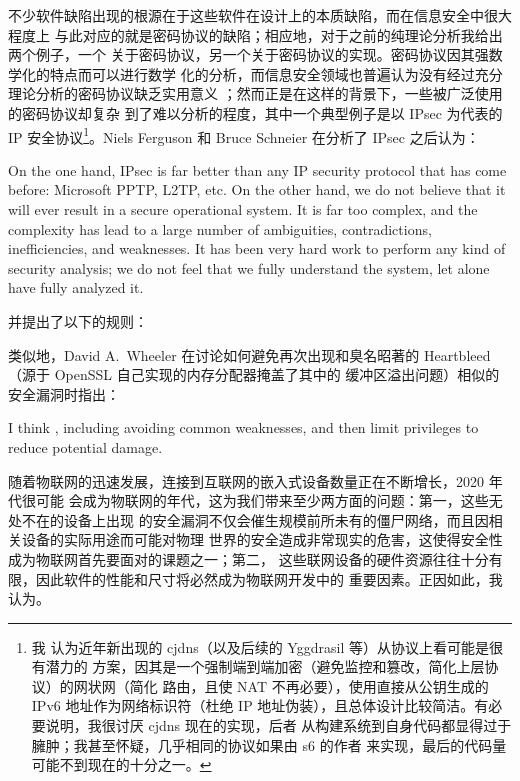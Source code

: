 不少软件缺陷出现的根源在于这些软件在设计上的本质缺陷，而在信息安全中很大程度上
与此对应的就是密码协议的缺陷；相应地，对于之前的纯理论分析我给出两个例子，一个
关于密码协议，另一个关于密码协议的实现。密码协议因其强数学化的特点而可以进行数学
化的分析，而信息安全领域也普遍认为没有经过充分理论分析的密码协议缺乏实用意义%
；然而正是在这样的背景下，一些被广泛使用的密码协议却复杂
到了难以分析的程度，其中一个典型例子是以 IPsec 为代表的 IP 安全协议\footnote{我
认为近年新出现的 cjdns（以及后续的 Yggdrasil 等）从协议上看可能是很有潜力的
方案，因其是一个强制端到端加密（避免监控和篡改，简化上层协议）的网状网（简化
路由，且使 NAT 不再必要），使用直接从公钥生成的 IPv6 地址作为网络标识符（杜绝
IP 地址伪装），且总体设计比较简洁。有必要说明，我很讨厌 cjdns 现在的实现，后者
从构建系统到自身代码都显得过于臃肿；我甚至怀疑，几乎相同的协议如果由 s6 的作者
来实现，最后的代码量可能不到现在的十分之一。}。Niels Ferguson 和 Bruce Schneier
在分析了 IPsec 之后认为：
\begin{quoting}
	On the one hand, IPsec is far better than any IP security protocol that has
	come before: Microsoft PPTP, L2TP, etc.  On the other hand, we do not
	believe that it will ever result in a secure operational system.  It is far
	too complex, and the complexity has lead to a large number of ambiguities,
	contradictions, inefficiencies, and weaknesses.  It has been very hard work
	to perform any kind of security analysis; we do not feel that we fully
	understand the system, let alone have fully analyzed it.
\end{quoting}
并提出了以下的规则：
\begin{quoting}
\end{quoting}
类似地，David A.\ Wheeler 在讨论如何避免再次出现和臭名昭著的
Heartbleed（源于 OpenSSL 自己实现的内存分配器掩盖了其中的
缓冲区溢出问题）相似的安全漏洞时指出：
\begin{quoting}
	I think , including avoiding
	common weaknesses, and then limit privileges to reduce potential damage.
\end{quoting}

随着物联网的迅速发展，连接到互联网的嵌入式设备数量正在不断增长，2020 年代很可能
会成为物联网的年代，这为我们带来至少两方面的问题：第一，这些无处不在的设备上出现
的安全漏洞不仅会催生规模前所未有的僵尸网络，而且因相关设备的实际用途而可能对物理
世界的安全造成非常现实的危害，这使得安全性成为物联网首先要面对的课题之一；第二，
这些联网设备的硬件资源往往十分有限，因此软件的性能和尺寸将必然成为物联网开发中的
重要因素。正因如此，我认为。

